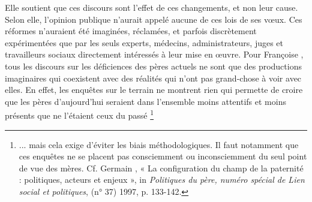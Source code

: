 Elle soutient que ces discours sont l'effet de ces changements, et non leur cause.  Selon elle, l'opinion publique n'aurait appelé aucune de ces lois de ses vœux. Ces réformes n'auraient été imaginées, réclamées, et parfois discrètement expérimentées que par les seuls experts, médecins, administrateurs, juges et travailleurs sociaux directement intéressés à leur mise en œuvre. Pour Françoise , tous les discours sur les déficiences des pères actuels ne sont que des productions imaginaires qui coexistent avec des réalités qui n'ont pas grand-chose à voir avec elles. En effet, les enquêtes sur le terrain ne montrent rien qui permette de croire que les pères d'aujourd'hui seraient dans l'ensemble moins attentifs et moins présents que ne l'étaient ceux du passé%
\footnote{... mais cela exige d'éviter les biais méthodologiques. Il faut notamment que ces enquêtes ne se placent pas consciemment ou inconsciemment du seul point de vue des mères. Cf. Germain , « La configuration du champ de la paternité : politiques, acteurs et enjeux », in \emph{Politiques du père, numéro spécial de Lien social et politiques}, (n° 37) 1997, p. 133-142.}%
